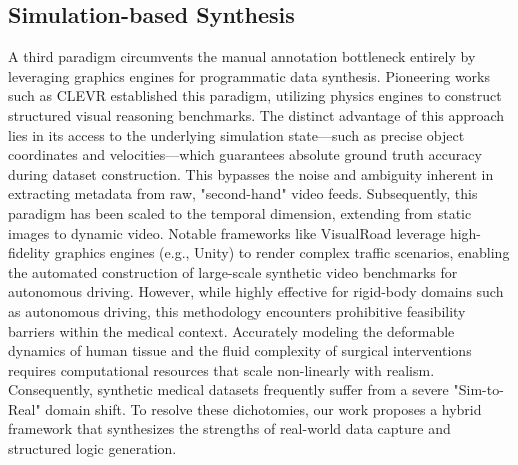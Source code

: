 \subsection{Simulation-based Synthesis}
A third paradigm circumvents the manual annotation bottleneck entirely by leveraging graphics engines for programmatic data synthesis.
Pioneering works such as CLEVR \cite{CLEVR} established this paradigm, utilizing physics engines to construct structured visual reasoning benchmarks.
The distinct advantage of this approach lies in its access to the underlying simulation state—such as precise object coordinates and velocities—which guarantees absolute ground truth accuracy during dataset construction. This bypasses the noise and ambiguity inherent in extracting metadata from raw, "second-hand" video feeds.
Subsequently, this paradigm has been scaled to the temporal dimension, extending from static images to dynamic video. Notable frameworks like VisualRoad \cite{visualroad} leverage high-fidelity graphics engines (e.g., Unity) to render complex traffic scenarios, enabling the automated construction of large-scale synthetic video benchmarks for autonomous driving.
However, while highly effective for rigid-body domains such as autonomous driving, this methodology encounters prohibitive feasibility barriers within the medical context.
Accurately modeling the deformable dynamics of human tissue and the fluid complexity of surgical interventions requires computational resources that scale non-linearly with realism.
Consequently, synthetic medical datasets frequently suffer from a severe "Sim-to-Real" domain shift.
To resolve these dichotomies, our work proposes a hybrid framework that synthesizes the strengths of real-world data capture and structured logic generation.
